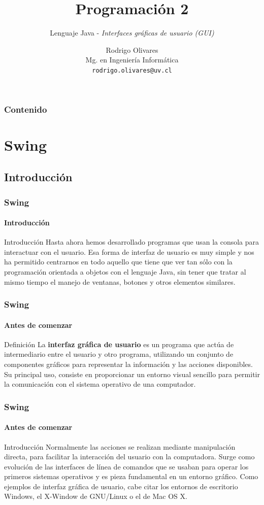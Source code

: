 \documentclass{beamer}
\title[\textbf{Programaci\'on 2}]{\textbf{Programaci\'on 2}}
\subtitle{Lenguaje Java - \emph{Interfaces gr\'aficas de usuario (GUI)}}
\author[Rodrigo Olivares]
{
	Rodrigo Olivares \\
	\vspace{0.5mm}
	Mg. en Ingenier\'ia Inform\'atica \\
	\vspace{0.5mm}
	\texttt{\normalsize rodrigo.olivares@uv.cl}
}
\institute[Universidad de Valpara\'iso]
\begin{document}
	\begin{frame}
		\titlepage
	\end{frame}

	\begin{frame}
		\frametitle{Contenido}
		\tableofcontents%
	\end{frame}

    \section{Swing}

    \subsection{Introducci\'on}

	\begin{frame}
		\frametitle{Swing}
		\framesubtitle{Introducci\'on}
		
		\begin{block}{Introducci\'on}
            Hasta ahora hemos desarrollado programas que usan la consola para interactuar con el usuario. Esa forma de interfaz de usuario es muy simple y nos ha permitido centrarnos en todo aquello que tiene que ver tan s\'olo con la programaci\'on orientada a objetos con el lenguaje Java, sin tener que tratar al mismo tiempo el manejo de ventanas, botones y otros elementos similares.
        \end{block}
	\end{frame}

	\begin{frame}
		\frametitle{Swing}
		\framesubtitle{Antes de comenzar}
		
		\begin{alertblock}{Definici\'on}
            La \textbf{interfaz gr\'afica de usuario} es un programa que act\'ua de intermediario entre el usuario y otro programa, utilizando un conjunto de componentes gr\'aficos para representar la informaci\'on y las acciones disponibles. Su principal uso, consiste en proporcionar un entorno visual sencillo para permitir la comunicaci\'on con el sistema operativo de una computador.
        \end{alertblock}
	\end{frame}

	\begin{frame}
		\frametitle{Swing}
		\framesubtitle{Antes de comenzar}
		
		\begin{block}{Introducci\'on}
            Normalmente las acciones se realizan mediante manipulaci\'on directa, para facilitar la interacci\'on del usuario con la computadora. Surge como evoluci\'on de las interfaces de l\'inea de comandos que se usaban para operar los primeros sistemas operativos y es pieza fundamental en un entorno gr\'afico. Como ejemplos de interfaz gr\'afica de usuario, cabe citar los entornos de escritorio Windows, el X-Window de GNU/Linux o el de Mac OS X.
        \end{block}
	\end{frame}
\end{document}
